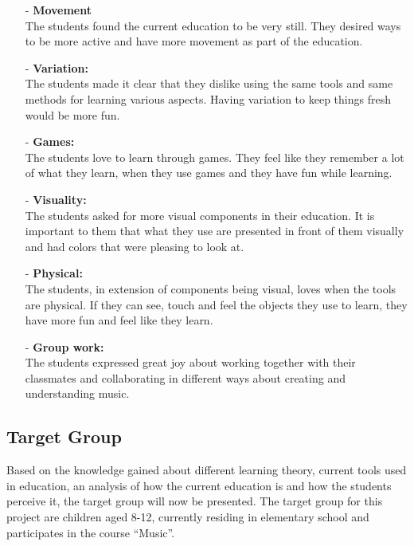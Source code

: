\begin{itemize}
	\item[-] \textbf{Movement}\\
	The students found the current education to be very still. They desired ways to be more active and have more movement as part of the education.\\
	\item[-] \textbf{Variation:}\\
	The students made it clear that they dislike using the same tools and same methods for learning various aspects. Having variation to keep things fresh would be more fun.\\
	\item[-] \textbf{Games:}\\
	The students love to learn through games. They feel like they remember a lot of what they learn, when they use games and they have fun while learning. \\
	\item[-] \textbf{Visuality:}\\
	The students asked for more visual components in their education. It is important to them that what they use are presented in front of them visually and had colors that were pleasing to look at.\\
	\item[-] \textbf{Physical:}\\
	The students, in extension of components being visual, loves when the tools are physical. If they can see, touch and feel the objects they use to learn, they have more fun and feel like they learn.\\
	\item[-] \textbf{Group work:}\\
	The students expressed great joy about working together with their classmates and collaborating in different ways about creating and understanding music.\\
	
\end{itemize}



\subsection{Target Group}
Based on the knowledge gained about different learning theory, current tools used in education, an analysis of how the current education is and how the students perceive it, the target group will now be presented.
The target group for this project are children aged 8-12, currently residing in elementary school and participates in the course “Music”.\\

